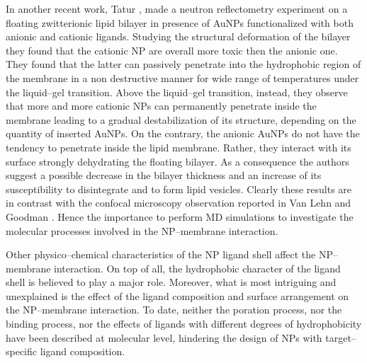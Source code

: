 In another recent work, Tatur \etal \cite{Maccarini2013}, made a neutron reflectometry experiment on a floating zwitterionic lipid bilayer in presence of \acp{AuNP} functionalized with both anionic and cationic ligands. Studying the structural deformation of the bilayer they found that the cationic \acs{NP} are overall more toxic then the anionic one. They found that the latter can passively penetrate into the hydrophobic region of the membrane in a non destructive manner for wide range of temperatures under the liquid--gel transition. Above the liquid--gel transition, instead, they observe that more and more cationic \acp{NP} can permanently penetrate inside the membrane leading to a gradual destabilization of its structure, depending on the quantity of inserted \acp{AuNP}. On the contrary, the anionic \acp{AuNP} do not have the tendency to penetrate inside the lipid membrane. Rather, they interact with its surface strongly dehydrating the floating bilayer. As a consequence the authors suggest a possible decrease in the bilayer thickness and an increase of its susceptibility to disintegrate and to form lipid vesicles. Clearly these results are in contrast with the confocal microscopy observation reported in Van Lehn \etal \cite{VanLehn2013} and Goodman \etal \cite{Goodman2004}. Hence the importance to perform \ac{MD} simulations to investigate the molecular processes involved in the \ac{NP}--membrane interaction.

Other physico--chemical characteristics of the \ac{NP} ligand shell affect the \ac{NP}--membrane interaction. On top of all, the hydrophobic character of the ligand shell is believed to play a major role. Moreover, what is most intriguing and unexplained is the effect of the ligand composition and surface arrangement on the \ac{NP}--membrane interaction. To date, neither the poration process, nor the binding process, nor the effects of ligands with different degrees of hydrophobicity have been described at molecular level, hindering the design of \acp{NP} with target--specific ligand composition.


